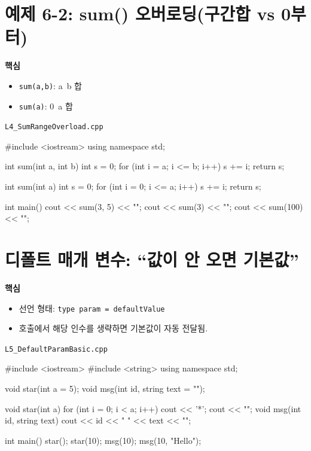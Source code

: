\documentclass[11pt,a4paper]{article}
\newcommand{\filetag}[1]{\texttt{\color{Accent}#1}}
\begin{document}
\section{예제 6-2: sum() 오버로딩(구간합 vs 0부터)}
\begin{GoalBox}
\textbf{핵심}
\begin{itemize}[leftmargin=18pt]
  \item \texttt{sum(a,b)}: a~b 합
  \item \texttt{sum(a)}: 0~a 합
\end{itemize}
\end{GoalBox}

\noindent\filetag{L4\_SumRangeOverload.cpp}
\begin{cppcode}
#include <iostream>
using namespace std;

int sum(int a, int b) {
    int s = 0;
    for (int i = a; i <= b; i++) s += i;
    return s;
}

int sum(int a) {
    int s = 0;
    for (int i = 0; i <= a; i++) s += i;
    return s;
}

int main() {
    cout << sum(3, 5) << "\n";
    cout << sum(3) << "\n";
    cout << sum(100) << "\n";
}
\end{cppcode}

\section{디폴트 매개 변수: ``값이 안 오면 기본값''}
\begin{GoalBox}
\textbf{핵심}
\begin{itemize}[leftmargin=18pt]
  \item 선언 형태: \texttt{type param = defaultValue}
  \item 호출에서 해당 인수를 생략하면 기본값이 자동 전달됨.
\end{itemize}
\end{GoalBox}

\noindent\filetag{L5\_DefaultParamBasic.cpp}
\begin{cppcode}
#include <iostream>
#include <string>
using namespace std;

void star(int a = 5);
void msg(int id, string text = "");

void star(int a) {
    for (int i = 0; i < a; i++) cout << '*';
    cout << "\n";
}
void msg(int id, string text) {
    cout << id << " " << text << "\n";
}

int main() {
    star();
    star(10);
    msg(10);
    msg(10, "Hello");
}
\end{cppcode}
\end{document}
